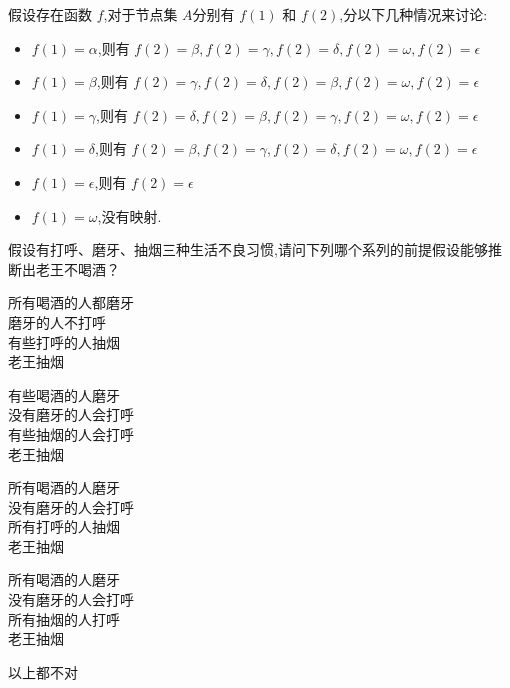 \documentclass[answers]{exam}
\begin{document}
\begin{questions}
	\begin{solution}
		假设存在函数 \( f \),对于节点集 \( A \)分别有 \( f(1) \) 和 \( f(2) \),分以下几种情况来讨论:
		\begin{itemize}
			\item \( f(1) = \alpha \),则有 \( f(2)=\beta, f(2)=\gamma, f(2)=\delta, f(2)=\omega, f(2)=\epsilon \)
			\item \( f(1) = \beta \),则有 \(f(2)=\gamma, f(2)=\delta,  f(2)=\beta, f(2)=\omega, f(2)=\epsilon \)
			\item \( f(1) = \gamma \),则有 \( f(2)=\delta, f(2)=\beta, f(2)=\gamma, f(2)=\omega, f(2)=\epsilon \)
			\item \( f(1) = \delta \),则有 \( f(2)=\beta, f(2)=\gamma, f(2)=\delta, f(2)=\omega, f(2)=\epsilon \)
			\item \( f(1) = \epsilon \),则有 \( f(2)=\epsilon \)
			\item \( f(1) = \omega \),没有映射.
		\end{itemize}
	\end{solution}

	\question 假设有打呼、磨牙、抽烟三种生活不良习惯,请问下列哪个系列的前提假设能够推断出老王不喝酒？

	\begin{oneparchoices}
		\choice
		\begin{minipage}{0.25\textwidth}
			所有喝酒的人都磨牙\\
			磨牙的人不打呼 \\
			有些打呼的人抽烟 \\
			老王抽烟
		\end{minipage}
		\choice
		\begin{minipage}{0.25\textwidth}
			有些喝酒的人磨牙 \\
			没有磨牙的人会打呼 \\
			有些抽烟的人会打呼 \\
			老王抽烟
		\end{minipage}
		\choice
		\begin{minipage}{0.25\textwidth}
			所有喝酒的人磨牙 \\
			没有磨牙的人会打呼 \\
			所有打呼的人抽烟 \\
			老王抽烟
		\end{minipage}
		\CorrectChoice
		\begin{minipage}{0.25\textwidth}
			所有喝酒的人磨牙 \\
			没有磨牙的人会打呼 \\
			所有抽烟的人打呼 \\
			老王抽烟
		\end{minipage}
		\choice
		\begin{minipage}{0.25\textwidth}
			以上都不对
		\end{minipage}
	\end{oneparchoices}


\end{questions}
\end{document}
